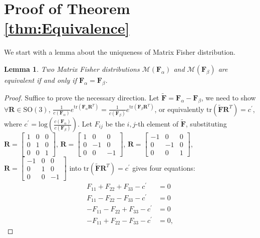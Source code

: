 \documentclass[12pt]{article}
\newtheorem{lemma}{Lemma}
\begin{document}
\section{Proof of Theorem \ref{thm:Equivalence} \label{apd:proof}}
We start with a lemma about the uniqueness of Matrix Fisher distribution.
\begin{lemma}
	Two Matrix Fisher distributions $\mathcal{M}(\mathbf{F}_\alpha)$ and $\mathcal{M}(\mathbf{F}_\beta)$ are equivalent if and only if $\mathbf{F}_\alpha = \mathbf{F}_\beta$.
\end{lemma}
\begin{proof}
	Suffice to prove the necessary direction.
	Let $\tilde{\mathbf{F}} = \mathbf{F}_\alpha-\mathbf{F}_\beta$, we need to show $\forall\mathbf{R}\in\mathrm{SO}(3)$, $\frac{1}{c(\mathbf{F}_\alpha)}e^{\mathrm{tr}(\mathbf{F}_\alpha\mathbf{R}^T)} = \frac{1}{c(\mathbf{F}_\beta)}e^{\mathrm{tr}(\mathbf{F}_\beta\mathbf{R}^T)}$, or equivalently $\mathrm{tr}(\tilde{\mathbf{F}}\mathbf{R}^T) = c^\prime$, where $c^\prime = \mathrm{log}\left(\frac{c(\mathbf{F}_\alpha)}{c(\mathbf{F}_\beta)}\right)$.
	Let $F_{ij}$ be the $i,j$-th element of $\tilde{\mathbf{F}}$, substituting $\mathbf{R}=\begin{bmatrix}
	1 & 0 & 0 \\ 0 & 1 & 0 \\ 0 & 0 & 1
	\end{bmatrix}$, $\mathbf{R}=\begin{bmatrix}
	1 & 0 & 0 \\ 0 & -1 & 0 \\ 0 & 0 & -1
	\end{bmatrix}$, $\mathbf{R}=\begin{bmatrix}
	-1 & 0 & 0 \\ 0 & -1 & 0 \\ 0 & 0 & 1
	\end{bmatrix}$, $\mathbf{R}=\begin{bmatrix}
	-1 & 0 & 0 \\ 0 & 1 & 0 \\ 0 & 0 & -1
	\end{bmatrix}$ into $\mathrm{tr}(\tilde{\mathbf{F}}\mathbf{R}^T) = c^\prime$ gives four equations:
	\begin{align*}
	F_{11}+F_{22}+F_{33}-c^\prime &= 0 \\
	F_{11}-F_{22}-F_{33}-c^\prime &= 0 \\
	-F_{11}-F_{22}+F_{33}-c^\prime &= 0 \\
	-F_{11}+F_{22}-F_{33}-c^\prime &= 0,
	\end{align*}

\end{proof}
\end{document}
